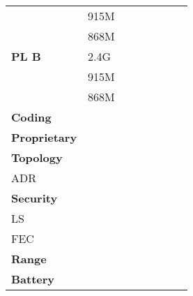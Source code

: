 \begin{longtable}{l|l|l|l|l|l|l|l}
	\                                  & 915M             &              &              &             &             &                 &                 \\
	\                                  & 868M             &              &              &             &             &                 &                 \\\hline
	\bf{\ac{PL}	B}                     & 2.4G             &              &              &             &             &                 &                 \\
	\                                  & 915M             &              &              &             &             &                 &                 \\
	\                                  & 868M             &              &              &             &             &                 &                 \\\hline
	\bf{Coding}                        &                  &              &              &             &             &                 &                 \\\hline
	\bf{Proprietary}                   &                  &              &              &             &             &                 &                 \\\hline
	\bf{Topology}                      & \                &              &              &             &             &                 &                 \\\hline
	\ac{ADR}                           & \                &              &              &             &             &                 &                 \\\hline
	\bf{Security}                      & \                &              &              &             &             &                 &                 \\\hline
	\ac{LS}                            & \                &              &              &             &             &                 &                 \\\hline
	\ac{FEC}                           & \                &              &              &             &             &                 &                 \\\hline
	\bf{Range}                         & \                &              &              &             &             &                 &                 \\\hline
	\bf{Battery}                       & \                &              &              &             &             &                 &                 \\\hline

\end{longtable}

